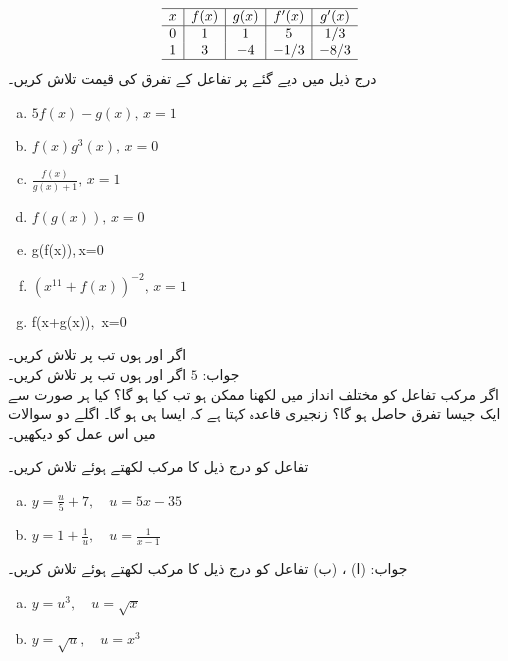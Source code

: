 \begin{align*}
\begin{array}{c|c|c|c|c}
\hline
x&f(x)&g(x)&f'(x)&g'(x)\\
\hline
0&1&1&5&1/3\\
1&3&-4&-1/3&-8/3\\
\hline
\end{array}
\end{align*}
درج ذیل میں دیے گئے  پر  تفاعل کے تفرق کی قیمت تلاش کریں۔
\begin{multicols}{2}
\begin{enumerate}[a.]

\item
$5f(x)-g(x),\, x=1$
\item
$f(x)g^3(x),\,x=0$
\item
$\tfrac{f(x)}{g(x)+1},\, x=1$
\item
$f(g(x)),\, x=0$
\item
g(f(x)),\,x=0
\item
$(x^{11}+f(x))^{-2},\, x=1$
\item
f(x+g(x)),\, x=0
\end{enumerate}
\end{multicols}

اگر  اور  ہوں تب  پر  تلاش کریں۔\\
جواب:\quad
$5$
اگر  اور  ہوں تب  پر  تلاش کریں۔
\\
اگر مرکب تفاعل کو مختلف انداز میں لکھنا ممکن ہو تب کیا ہو گا؟  کیا ہر صورت سے ایک جیسا تفرق حاصل ہو گا؟ زنجیری قاعدہ کہتا ہے کہ ایسا ہی ہو گا۔ اگلے دو سوالات میں اس عمل کو دیکھیں۔

تفاعل   کو درج ذیل کا مرکب لکھتے ہوئے   تلاش کریں۔\\
\begin{enumerate}[a.]

\item
$y=\tfrac{u}{5}+7,\quad u=5x-35$
\item
$y=1+\tfrac{1}{u},\quad u=\tfrac{1}{x-1}$

\end{enumerate}
جواب:\quad
(ا) ، (ب) 
تفاعل   کو درج ذیل کا مرکب لکھتے ہوئے   تلاش کریں۔\\
\begin{enumerate}[a.]

\item
$y=u^3,\quad u=\sqrt{x}$
\item
$y=\sqrt{u},\quad u=x^3$

\end{enumerate}

